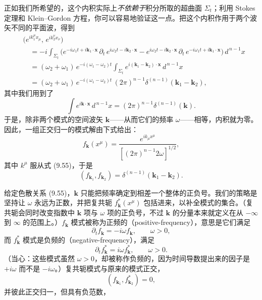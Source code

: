正如我们所希望的，这个内积实际上\emph{不依赖于}积分所取的超曲面 $\Sigma_t$；利用 Stokes 定理和 Klein–Gordon 方程，你可以容易地验证这一点。把这个内积作用于两个波矢不同的平面波，得到
\begin{align*}
&\bigl(e^{ik_1^\mu x_\mu},\, e^{ik_2^\nu x_\nu}\bigr) \\
&\quad = -i\int_{\Sigma_t}\bigl(e^{-i\omega_1 t + i\mathbf{k}_1\cdot\mathbf{x}}\,\partial_t\, e^{i\omega_2 t - i\mathbf{k}_2\cdot\mathbf{x}} - e^{i\omega_2 t - i\mathbf{k}_2\cdot\mathbf{x}}\,\partial_t\, e^{-i\omega_1 t + i\mathbf{k}_1\cdot\mathbf{x}}\bigr)\, d^{\,n-1}x \\
&\quad = (\omega_2 + \omega_1)\, e^{-i(\omega_1 - \omega_2)t}\int_{\Sigma_t} e^{i(\mathbf{k}_1 - \mathbf{k}_2)\cdot\mathbf{x}}\, d^{\,n-1}x \\
&\quad = (\omega_2 + \omega_1)\, e^{-i(\omega_1 - \omega_2)t}\,(2\pi)^{n-1}\delta^{(n-1)}(\mathbf{k}_1 - \mathbf{k}_2),
\tag{9.57}
\end{align*}
其中我们用到了
\begin{equation*}
\int e^{i\mathbf{k}\cdot\mathbf{x}}\, d^{\,n-1}x = (2\pi)^{n-1}\delta^{(n-1)}(\mathbf{k}).
\tag{9.58}
\end{equation*}
于是，除非两个模式的空间波矢 $\mathbf{k}$——从而它们的频率 $\omega$——相等，内积就为零。因此，一组正交归一的模式解由下式给出：
\begin{equation*}
f_{\mathbf{k}}(x^{\mu}) = \frac{e^{ik_\mu x^\mu}}{\left[(2\pi)^{n-1}2\omega\right]^{1/2}},
\tag{9.59}
\end{equation*}
其中 $k^{\mu}$ 服从式 (9.55)，于是
\begin{equation*}
(f_{\mathbf{k}_1}, f_{\mathbf{k}_2}) = \delta^{(n-1)}(\mathbf{k}_1 - \mathbf{k}_2).
\tag{9.60}
\end{equation*}

给定色散关系 (9.55)，$\mathbf{k}$ 只能把频率确定到相差一个整体的正负号。我们的策略是坚持让 $\omega$ 永远为正数，并把复共轭 $f^{*}_{\mathbf{k}}(x^{\mu})$ 包括进来，以补全模式的集合。（复共轭会同时改变指数中 $\mathbf{k}$ 项与 $\omega$ 项的正负号，不过 $\mathbf{k}$ 的分量本来就定义在从 $-\infty$ 到 $\infty$ 的范围上。）$f_{\mathbf{k}}$ 模式被称为正频的（positive-frequency），意思是它们满足
\begin{equation*}
\partial_t f_{\mathbf{k}} = -i\omega f_{\mathbf{k}}, \qquad \omega > 0,
\tag{9.61}
\end{equation*}
而 $f^{*}_{\mathbf{k}}$ 模式是负频的（negative-frequency），满足
\begin{equation*}
\partial_t f^{*}_{\mathbf{k}} = i\omega f^{*}_{\mathbf{k}}, \qquad \omega > 0.
\tag{9.62}
\end{equation*}
（当心：这些模式虽然 $\omega > 0$，却被称作负频的，因为时间导数提出来的因子是 $+i\omega$ 而不是 $-i\omega$。）复共轭模式与原来的模式正交，
\begin{equation*}
(f_{\mathbf{k}_1}, f^{*}_{\mathbf{k}_2}) = 0,
\tag{9.63}
\end{equation*}
并彼此正交归一，但具有负范数，

